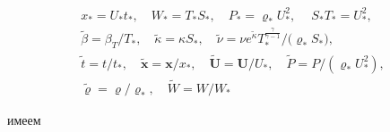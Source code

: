 \begin{equation}

\label{lukashev:zamen}

\begin{array}{c}

x_*=U_*t_*,\quad  W_*=T_*S_*, \quad P_*=\varrho_*U_*^2, ~\quad S_* T_*=U_*^2,

\\

\widetilde{\beta}=\beta_T/T_*, \quad \widetilde{\kappa}=\kappa S_*, \quad

\widetilde{\nu}=\nu e^{\widetilde{\kappa}} T_*^{\frac\gamma{\gamma-1}}/\big(\varrho_*S_*\big),

\\

\widetilde{t}=t/t_*, \quad \widetilde{\boldsymbol x}= \boldsymbol x/x_*, \quad \widetilde{\boldsymbol U}= \boldsymbol U/U_*, \quad \widetilde{P}=P/(\varrho_*U_*^2),

\\

\widetilde{\varrho}=\varrho/\varrho_*, \quad \widetilde{W}=W/ W_* 

\end{array}

\end{equation}

имеем

